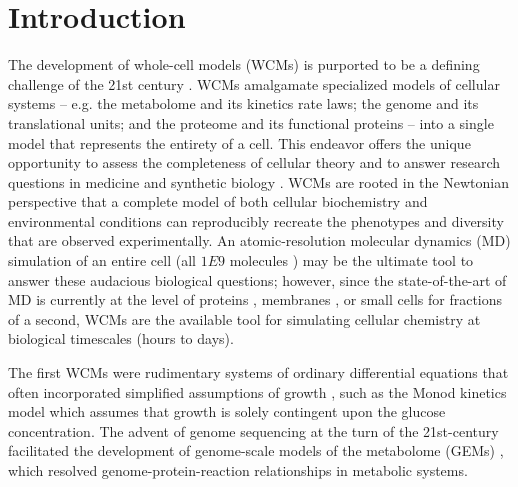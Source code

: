 \label{WCMpy_chapter}

\section{Introduction}
The development of whole-cell models (WCMs) \cite{Bhat2020Whole-CellSurvey} is purported to be a defining challenge of the 21st century \cite{Tomita2001Whole-cellCentury}. WCMs amalgamate specialized models of cellular systems -- e.g. the metabolome and its kinetics rate laws; the genome and its translational units; and the proteome and its functional proteins -- into a single model that represents the entirety of a cell. This endeavor offers the unique opportunity to assess the completeness of cellular theory \cite{Palsson2000TheBiology,Feig2019Whole-cellDetail} and to answer research questions in medicine \cite{Bordbar2015PersonalizedPharmacodynamics,Loscalzo2011SystemsMedicine} and synthetic biology \cite{Purcell2013TowardsBiology}. WCMs are rooted in the Newtonian perspective that a complete model of both cellular biochemistry and environmental conditions can reproducibly recreate the phenotypes and diversity that are observed experimentally. An atomic-resolution molecular dynamics (MD) simulation of an entire cell (all $1E9$ molecules \cite[][approximated from cellular mass]{Lewis2014MassPopulations}) may be the ultimate tool to answer these audacious biological questions; however, since the state-of-the-art of MD is currently at the level of proteins \cite{Adcock2006MolecularProteins}, membranes \cite{Egberts1994MolecularMembrane,Alper1993ComputerDynamics,Alper1993TheStudy}, or small cells \cite{Perilla2015MolecularComplexes} for fractions of a second, WCMs are the available tool for simulating cellular chemistry \cite{Feig2015CompleteBiology} at biological timescales (hours to days). 

The first WCMs \cite{Karr2015TheModeling} were rudimentary systems of ordinary differential equations that often incorporated simplified assumptions of growth \cite{PERRET1960APopulation}, such as the Monod kinetics model \cite{Han1988ExtendedInhibition} which assumes that growth is solely contingent upon the glucose concentration. The advent of genome sequencing at the turn of the 21st-century \cite{Collins2003TheBiology, Covert2001MetabolicSilico} facilitated the development of genome-scale models of the metabolome (GEMs) \cite{Varma1994StoichiometricW3110,Edwards2000TheCapabilities}, which resolved genome-protein-reaction relationships \cite{Edwards2001InData} in metabolic systems. 

